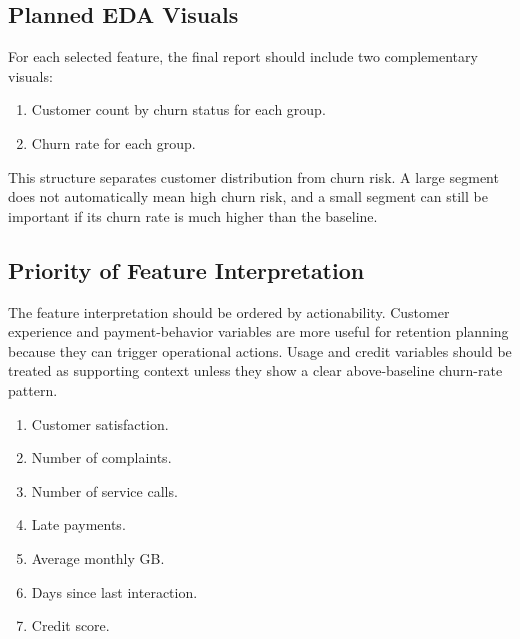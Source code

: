 \subsection{Planned EDA Visuals}
For each selected feature, the final report should include two complementary
visuals:
\begin{enumerate}
  \item Customer count by churn status for each group.
  \item Churn rate for each group.
\end{enumerate}
This structure separates customer distribution from churn risk. A large segment
does not automatically mean high churn risk, and a small segment can still be
important if its churn rate is much higher than the baseline.

\subsection{Priority of Feature Interpretation}
The feature interpretation should be ordered by actionability. Customer
experience and payment-behavior variables are more useful for retention
planning because they can trigger operational actions. Usage and credit
variables should be treated as supporting context unless they show a clear
above-baseline churn-rate pattern.

\begin{enumerate}
  \item Customer satisfaction.
  \item Number of complaints.
  \item Number of service calls.
  \item Late payments.
  \item Average monthly GB.
  \item Days since last interaction.
  \item Credit score.
\end{enumerate}
